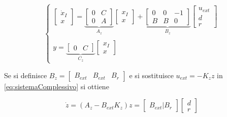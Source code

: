 		\begin{equation}
			\begin{cases}
				\begin{bmatrix}
					\dot{x}_I \\
					x
				\end{bmatrix}
				=
				\underbrace{
				\begin{bmatrix}
					0 & C \\
					0 & A
				\end{bmatrix}
				}_\text{$A_z$}
				\begin{bmatrix}
					x_I \\
					x
				\end{bmatrix}
				+
				\underbrace{
				\begin{bmatrix}
					0 & 0 & -1 \\
					B & B & 0
				\end{bmatrix}
				}_\text{$B_z$}
				\begin{bmatrix}
					u_{ext} \\
					d       \\
					r
				\end{bmatrix} \\
				\\ %
				y=
				\underbrace{
				\begin{bmatrix}
					0 & C
				\end{bmatrix}
				}_\text{$C_z$}
				\begin{bmatrix}
					x_I \\
					x
				\end{bmatrix}
			\end{cases}
			\label{eq:sistemaComplessivo}
		\end{equation}
	
		\noindent Se si definisce $B_z=\begin{bmatrix}B_{ext} & B_{ext} & B_r\end{bmatrix}$ e si sostituisce $u_{ext}=-K_zz$ in \ref{eq:sistemaComplessivo} si ottiene
		
		\begin{equation*}
			\dot{z}=(A_z - B_{ext}K_z)z=
			\begin{bmatrix}
				B_{ext} | B_r
			\end{bmatrix}
			\begin{bmatrix}
				d \\
				r
			\end{bmatrix}
		\end{equation*}
		
